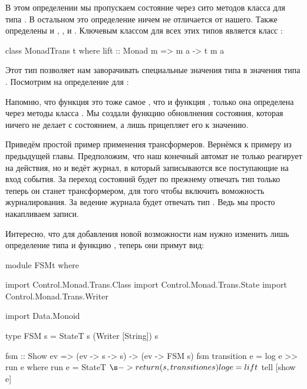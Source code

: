 
В этом определении мы пропускаем состояние через сито методов класса
 для типа . В остальном это определение ничем не
отличается от нашего. Также определены и , ,
 и . Ключевым классом для всех этих типов является
класс :


\begin{code}
class MonadTrans t where
    lift :: Monad m => m a -> t m a 
\end{code}

Этот тип позволяет нам заворачивать специальные значения типа  в
значения типа . Посмотрим на определение для :



Напомню, что функция  это тоже самое , что и функция
, только она определена через методы класса . Мы
создали функцию обновлнения состояния, которая ничего не делает с
состоянием, а лишь прицепляет его к значению.

Приведём простой пример применения трансформеров. Вернёмся к примеру
 из предыдущей главы. Предположим, что наш конечный автомат не
только реагирует на действия, но и ведёт журнал, в который записываются
все поступающие на вход события. За переход состояний будет по прежнему
отвечать тип  только теперь он станет трансформером, для того
чтобы включить воможность журналирования. За ведение журнала будет
отвечать тип . Ведь мы просто накапливаем записи.

Интересно, что для добавления новой возможности нам нужно изменить лишь
определение типа  и функцию , теперь они примут вид:


\begin{code}
module FSMt where

import Control.Monad.Trans.Class
import Control.Monad.Trans.State
import Control.Monad.Trans.Writer

import Data.Monoid

type FSM s = StateT s (Writer [String]) s

fsm :: Show ev => (ev -> s -> s) -> (ev -> FSM s)
fsm transition e = log e >> run e
    where run e = StateT $ \s -> return (s, transition e s)  
          log e = lift $ tell [show e] 
\end{code}

